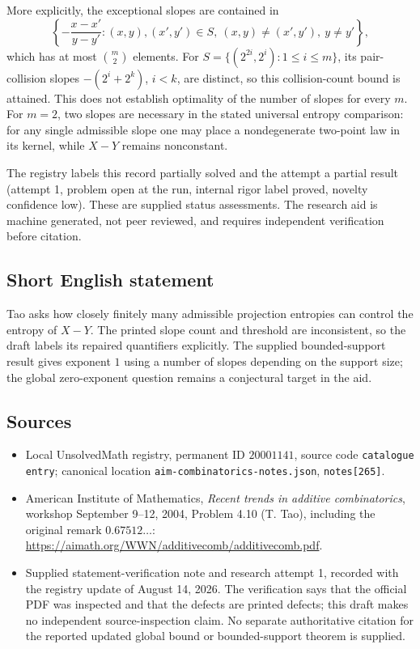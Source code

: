 \documentclass[11pt]{article}
\begin{document}
More explicitly, the exceptional slopes are contained in
\[
\left\{-\frac{x-x'}{y-y'}:(x,y),(x',y')\in S,\ (x,y)\ne(x',y'),\ y\ne y'\right\},
\]
which has at most \(\binom m2\) elements. For \(S=\{(2^{2i},2^i):1\le i\le m\}\), its pair-collision slopes \(-(2^i+2^k)\), \(i<k\), are distinct, so this collision-count bound is attained. This does not establish optimality of the number of slopes for every \(m\). For \(m=2\), two slopes are necessary in the stated universal entropy comparison: for any single admissible slope one may place a nondegenerate two-point law in its kernel, while \(X-Y\) remains nonconstant.

The registry labels this record partially solved and the attempt a partial result (attempt 1, problem open at the run, internal rigor label proved, novelty confidence low). These are supplied status assessments. The research aid is machine generated, not peer reviewed, and requires independent verification before citation.
\subsection{Short English statement}
Tao asks how closely finitely many admissible projection entropies can control the entropy of \(X-Y\). The printed slope count and threshold are inconsistent, so the draft labels its repaired quantifiers explicitly. The supplied bounded-support result gives exponent \(1\) using a number of slopes depending on the support size; the global zero-exponent question remains a conjectural target in the aid.
\subsection{Sources}
\begin{itemize}
\item Local UnsolvedMath registry, permanent ID \(20001141\), source code \texttt{catalogue entry}; canonical location \texttt{aim-combinatorics-notes.json}, \texttt{notes[265]}.
\item American Institute of Mathematics, \emph{Recent trends in additive combinatorics}, workshop September 9--12, 2004, Problem 4.10 (T. Tao), including the original remark \(0.67512\ldots\): \url{https://aimath.org/WWN/additivecomb/additivecomb.pdf}.
\item Supplied statement-verification note and research attempt 1, recorded with the registry update of August 14, 2026. The verification says that the official PDF was inspected and that the defects are printed defects; this draft makes no independent source-inspection claim. No separate authoritative citation for the reported updated global bound or bounded-support theorem is supplied.
\end{itemize}
\end{document}

